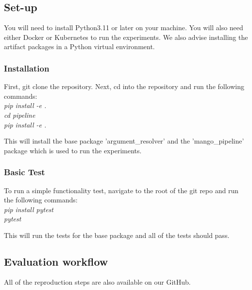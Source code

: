 \subsection{Set-up}

You will need to install Python3.11 or later on your machine.
You will also need either Docker or Kubernetes to run the experiments.
We also advise installing the artifact packages in a Python virtual environment.

\subsubsection{Installation}

First, git clone the repository.
Next, cd into the repository and run the following commands: \\
\textit{
pip install -e . \\
cd pipeline \\
pip install -e . \\
}

This will install the base package 'argument\_resolver' and the 'mango\_pipeline' package which is used to run the experiments.

\subsubsection{Basic Test}
To run a simple functionality test, navigate to the root of the git repo and run the following commands: \\
\textit{
pip install pytest \\
pytest \\
}

This will run the tests for the base package and all of the tests should pass.


\subsection{Evaluation workflow}
All of the reproduction steps are also available on our GitHub\footnotemark[1].

